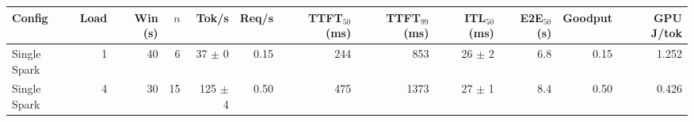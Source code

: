 \begin{tabular}{l r r r r r r r r r r r}
\toprule
Config & Load & Win (s) & $n$ & Tok/s & Req/s & TTFT$_{50}$ (ms) & TTFT$_{99}$ (ms) & ITL$_{50}$ (ms) & E2E$_{50}$ (s) & Goodput & GPU J/tok \\
\midrule
Single Spark & 1 & 40 & 6\rlap{$^\dagger$} & 37 $\pm$ 0 & 0.15 & 244 & 853 & 26 $\pm$ 2 & 6.8 & 0.15 & 1.252 \\
Single Spark & 4 & 30 & 15\rlap{$^\dagger$} & 125 $\pm$ 4 & 0.50 & 475 & 1373 & 27 $\pm$ 1 & 8.4 & 0.50 & 0.426 \\
\bottomrule
\end{tabular}
